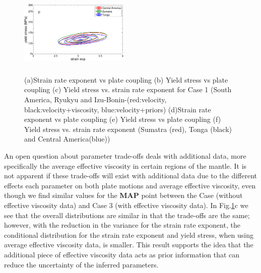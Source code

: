 \documentclass[12pt]{article}
\begin{document}
\begin{figure}[H]
{\includegraphics[height=35mm,width=52mm]{fig5f.pdf}%
}
\caption{(a)Strain rate exponent vs plate coupling (b) Yield stress vs plate coupling (c) Yield stress vs. strain rate exponent for Case 1 (South America, Ryukyu and Izu-Bonin-(red:velocity, black:velocity+viscosity, blue:velocity+priors) (d)Strain rate exponent vs plate coupling (e) Yield stress vs plate coupling (f) Yield stress vs. strain rate exponent  (Sumatra (red), Tonga (black) and Central America(blue))}
\label{fig:distrib}
\end{figure}


An open question about parameter trade-offs deals with additional data, more specifically the average effective viscosity in certain regions of the mantle. 
It is not apparent if these trade-offs will exist with additional data due to the different effects each parameter on both plate motions and average effective viscosity, even though we find similar values for the \textbf{MAP} point between the Case  (without effective viscosity data) and Case 3 (with effective viscosity data). In Fig.\ref{fig:distrib}c we see that the overall distributions are similar in that the trade-offs are the same; however, with the reduction in the variance for the strain rate exponent, the conditional distribution for the strain rate exponent and yield stress, when using average effective viscosity data, is smaller. This result supports the idea that the additional piece of effective viscosity data acts as prior information that can reduce the uncertainty of the inferred parameters. 
\end{document}
